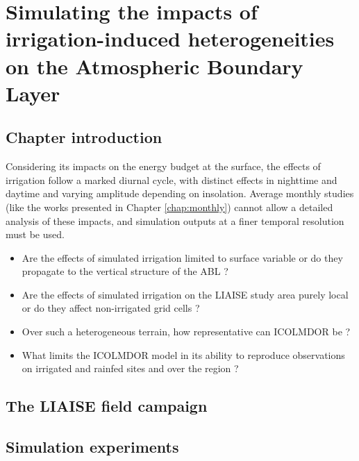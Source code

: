 \chapter{Simulating the impacts of irrigation-induced heterogeneities on the Atmospheric Boundary Layer}
\label{chap:liaise}
\minitoc
\pagebreak

\section{Chapter introduction}

Considering its impacts on the energy budget at the surface, the effects of irrigation follow a marked diurnal cycle, with distinct effects in nighttime and daytime and varying amplitude depending on insolation. Average monthly studies (like the works presented in Chapter \ref{chap:monthly}) cannot allow a detailed analysis of these impacts, and simulation outputs at a finer temporal resolution must be used.


\begin{itemize}
    \item Are the effects of simulated irrigation limited to surface variable or do they propagate to the vertical structure of the ABL ?
    \item Are the effects of simulated irrigation on the LIAISE study area purely local or do they affect non-irrigated grid cells ?
    \item Over such a heterogeneous terrain, how representative can ICOLMDOR be ?%
    \item What limits the ICOLMDOR model in its ability to reproduce observations on irrigated and rainfed sites and over the region ?
\end{itemize}

\section{The LIAISE field campaign}

\section{Simulation experiments}

